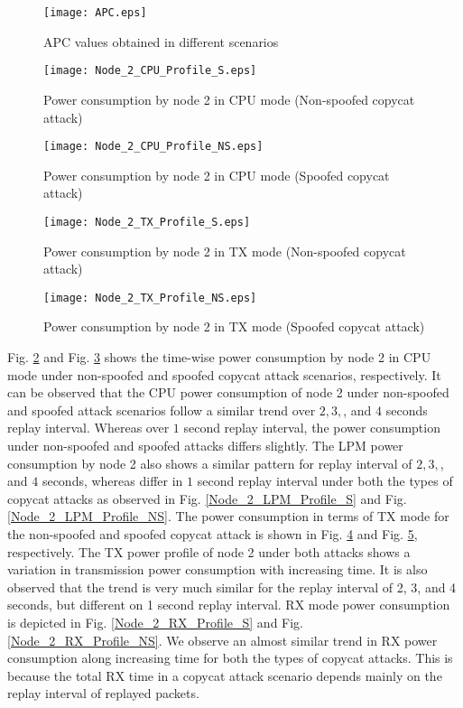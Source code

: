 \documentclass[]{svjour3}                     %
\begin{document}
\begin{figure}[!h]
	\centering
	\texttt{[image: APC.eps]}
	\caption{APC values obtained in different scenarios}
	\label{APC}
\end{figure}

\begin{figure}[!h]
	\centering
	\texttt{[image: Node\_2\_CPU\_Profile\_S.eps]}
	\caption{Power consumption by node 2 in CPU mode (Non-spoofed copycat attack)}
	\label{Node_2_CPU_Profile_S}
\end{figure}


\begin{figure}[!h]
	\centering
	\texttt{[image: Node\_2\_CPU\_Profile\_NS.eps]}
	\caption{Power consumption by node 2 in CPU mode (Spoofed copycat attack)}
	\label{Node_2_CPU_Profile_NS}
\end{figure}
\begin{figure}[!h]
	\centering
	\texttt{[image: Node\_2\_TX\_Profile\_S.eps]}
	\caption{Power consumption by node 2 in TX mode (Non-spoofed copycat attack)}
	\label{Node_2_TX_Profile_S}
\end{figure}

\begin{figure}[!h]
	\centering
	\texttt{[image: Node\_2\_TX\_Profile\_NS.eps]}
	\caption{Power consumption by node 2 in TX mode (Spoofed copycat attack)}
	\label{Node_2_TX_Profile_NS}
\end{figure}



Fig. \ref{Node_2_CPU_Profile_S} and  Fig. \ref{Node_2_CPU_Profile_NS} shows the time-wise power consumption by node 2 in CPU mode under non-spoofed and spoofed copycat attack scenarios, respectively. It can be observed that the CPU power consumption of node 2 under non-spoofed and spoofed attack scenarios follow a similar trend over $ 2, 3, $, and $ 4 $ seconds replay interval. Whereas over $ 1 $ second replay interval, the power consumption under non-spoofed and spoofed attacks differs slightly. The LPM power consumption by node 2 also shows a similar pattern for replay interval of $ 2, 3, $, and $ 4 $ seconds, whereas differ in $ 1 $ second replay interval under both the types of copycat attacks as observed in Fig. \ref{Node_2_LPM_Profile_S} and Fig. \ref{Node_2_LPM_Profile_NS}. The power consumption in terms of TX mode for the non-spoofed and spoofed copycat attack is shown in Fig. \ref{Node_2_TX_Profile_S} and Fig. \ref{Node_2_TX_Profile_NS}, respectively. The TX power profile of node 2 under both attacks shows a variation in transmission power consumption with increasing time. It is also observed that the trend is very much similar for the replay interval of 2, 3, and 4 seconds, but different on 1 second replay interval. RX mode power consumption is depicted in Fig. \ref{Node_2_RX_Profile_S} and Fig. \ref{Node_2_RX_Profile_NS}. We observe an almost similar trend in RX power consumption along increasing time for both the types of copycat attacks. This is because the total RX time in a copycat attack scenario depends mainly on the replay interval of replayed packets. 
\end{document}
